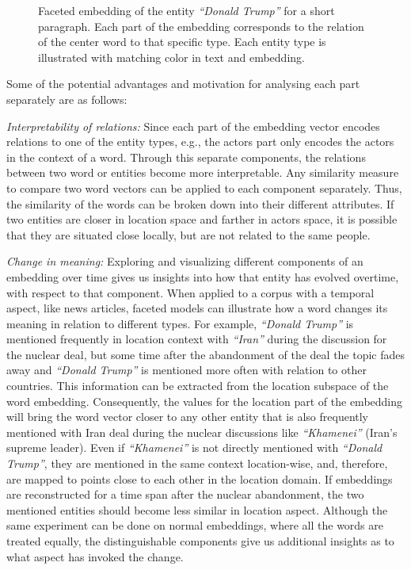\begin{figure}
\centering 
\resizebox{0.97\textwidth}{0.3\textwidth}{      

}
\caption{Faceted embedding of the entity \emph{``Donald Trump''} for a short paragraph. Each part of the embedding corresponds to the relation of the center word to that specific type. Each entity type is illustrated with matching color in text and embedding. }
\label{fig:faceted_emb}
\end{figure} 
Some of the potential advantages and motivation for analysing each part separately are as follows: 
\begin{compactitem}
\item \emph{Interpretability of relations:} Since each part of the embedding vector encodes relations to one of the entity types, e.g., the actors part only encodes the actors in the context of a word. Through this separate components, the relations between two word or entities become more interpretable. Any similarity measure to compare two word vectors can be applied to each component separately. Thus, the similarity of the words can be broken down into their different attributes. If two entities are closer in location space and farther in actors space, it is possible that they are situated close locally, but are not related to the same people. \\

\item \emph{Change in meaning:} Exploring and visualizing different components of an embedding over time gives us insights into how that entity has evolved overtime, with respect to that component. When applied to a corpus with a temporal aspect, like news articles, faceted models can illustrate how a word changes its meaning in relation to different types. For example, \emph{``Donald Trump''} is mentioned frequently in location context with \emph{``Iran''} during the discussion for the nuclear deal, but some time after the abandonment of the deal the topic fades away and \emph{``Donald Trump''}  is mentioned more often with relation to other countries. This information can be extracted from the location subspace of the word embedding. Consequently, the values for the location part of the embedding will bring the word vector closer to any other entity that is also frequently mentioned with Iran deal during the nuclear discussions like \emph{``Khamenei''} (Iran's supreme leader). Even if \emph{``Khamenei''} is not directly mentioned with \emph{``Donald Trump''}, they are mentioned in the same context location-wise, and, therefore, are mapped to points close to each other in the location domain. If embeddings are reconstructed for a time span after the nuclear abandonment, the two mentioned entities should become less similar in location aspect. Although the same experiment can be done on normal embeddings, where all the words are treated equally, the distinguishable components give us additional insights as to what aspect has invoked the change.\\


\end{compactitem}
